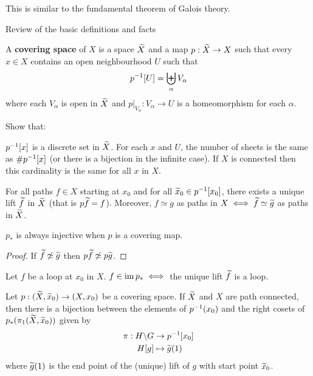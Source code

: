 \begin{rmk}
	This is similar to the fundamental theorem of Galois theory.
\end{rmk}

Review of the basic definitions and facts

\begin{defn}
	A \textbf{covering space} of $X$ is a space $\widetilde X$ and a map $p: \widetilde X \to X$ such that every $x \in X$ contains an open neighbourhood $U$ such that
	\[p^{-1}[U] = \biguplus_\alpha V_\alpha\]
	where each $V_\alpha$ is open in $\widetilde X$ and $p|_{V_\alpha}: V_\alpha \to U$ is a homeomorphism for each $\alpha$.
\end{defn}

\begin{exer}
	Show that:
	\begin{itm}
		\io $p^{-1}[x]$ is a discrete set in $\widetilde X$.
		\io For each $x$ and $U$, the number of sheets is the same as $\#p^{-1}[x]$ (or there is a bijection in the infinite case).
		\io If $X$ is connected then this cardinality is the same for all $x$ in $X$.
	\end{itm}
\end{exer}

\begin{prop}
	For all paths $f \in X$ starting at $x_0$ and for all $\widetilde x_0 \in p^{-1}[x_0]$, there exists a unique lift $\widetilde f$ in $\widetilde X$ (that is $p\widetilde f=f$).
	Moreover, $f \simeq g$ as paths in $X \iff \widetilde f \simeq \widetilde g$ as paths in $\widetilde X$.
\end{prop}

\begin{prop}
	$p_*$ is always injective when $p$ is a covering map.
\end{prop}

\begin{proof}
	If $\widetilde f \not\simeq \widetilde g$ then $p\widetilde f \not\simeq p\widetilde g$.
\end{proof}

\begin{exer}
	Let $f$ be a loop at $x_0$ in $X$.
	$f \in \operatorname{im} p_* \iff$ the unique lift $\widetilde f$ is a loop.
\end{exer}

\begin{prop}
	Let $p:(\widetilde X,\widetilde x_0) \to (X,x_0)$ be a covering space.
	If $\widetilde X$ and $X$ are path connected, then there is a bijection between the elements of $p^{-1}(x_0)$ and the right cosets of $p_*(\pi_1(\widetilde X, \widetilde x_0))$ given by
	\begin{align*}
		\pi: H\backslash G &\to p^{-1}[x_0] \\
		H[g] &\mapsto \widetilde g(1)
	\end{align*}
	where $\widetilde g(1)$ is the end point of the (unique) lift of $g$ with start point $\widetilde x_0$.
\end{prop}
